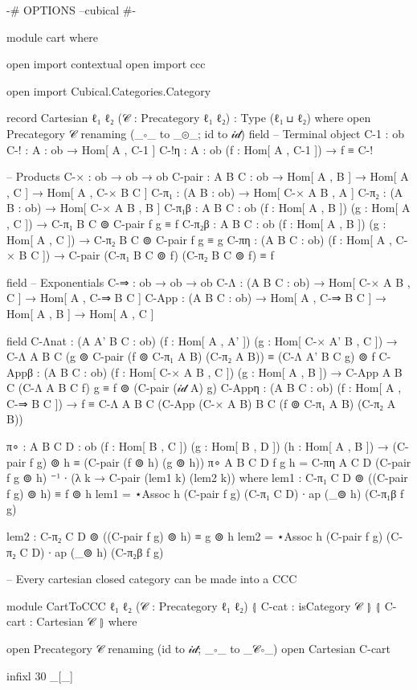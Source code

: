 \begin{code}[hide]
{-# OPTIONS --cubical #-}

module cart where

open import contextual
open import ccc

open import Cubical.Categories.Category

record Cartesian {ℓ₁ ℓ₂} (𝒞 : Precategory ℓ₁ ℓ₂) : Type (ℓ₁ ⊔ ℓ₂) where
  open Precategory 𝒞 renaming (_∘_ to _⊚_; id to 𝒾𝒹)
  field
    -- Terminal object
    C-1 : ob
    C-! : {A : ob} → Hom[ A , C-1 ]
    C-!η : {A : ob} (f : Hom[ A , C-1 ]) → f ≡ C-!

    -- Products
    C-× : ob → ob → ob
    C-pair : {A B C : ob} → Hom[ A , B ] → Hom[ A , C ] → Hom[ A , C-× B C ]
    C-π₁ : (A B : ob) → Hom[ C-× A B , A ]
    C-π₂ : (A B : ob) → Hom[ C-× A B , B ]
    C-π₁β : {A B C : ob} (f : Hom[ A , B ]) (g : Hom[ A , C ]) →
      C-π₁ B C ⊚ C-pair f g ≡ f
    C-π₂β : {A B C : ob} (f : Hom[ A , B ]) (g : Hom[ A , C ]) →
      C-π₂ B C ⊚ C-pair f g ≡ g
    C-πη : (A B C : ob) (f : Hom[ A , C-× B C ]) →
      C-pair (C-π₁ B C ⊚ f) (C-π₂ B C ⊚ f) ≡ f

  field
    -- Exponentials
    C-⇒ : ob → ob → ob
    C-Λ : (A B C : ob) → Hom[ C-× A B , C ] → Hom[ A , C-⇒ B C ]
    C-App : (A B C : ob) → Hom[ A , C-⇒ B C ] → Hom[ A , B ] → Hom[ A , C ]

  field
    C-Λnat : (A A' B C : ob) (f : Hom[ A , A' ]) (g : Hom[ C-× A' B , C ]) →
      C-Λ A B C (g ⊚ C-pair (f ⊚ C-π₁ A B) (C-π₂ A B)) ≡ (C-Λ A' B C g) ⊚ f
    C-Appβ : (A B C : ob) (f : Hom[ C-× A B , C ]) (g : Hom[ A , B ]) →
      C-App A B C (C-Λ A B C f) g ≡ f ⊚ (C-pair (𝒾𝒹 A) g)
    C-Appη : (A B C : ob) (f : Hom[ A , C-⇒ B C ]) →
      f ≡ C-Λ A B C (C-App (C-× A B) B C (f ⊚ C-π₁ A B) (C-π₂ A B))

  π∘ : {A B C D : ob} (f : Hom[ B , C ]) (g : Hom[ B , D ]) (h : Hom[ A , B ]) →
    (C-pair f g) ⊚ h ≡ (C-pair (f ⊚ h) (g ⊚ h))
  π∘ {A} {B} {C} {D} f g h =
    C-πη A C D (C-pair f g ⊚ h) ⁻¹
    ∙ (λ k → C-pair (lem1 k) (lem2 k)) where
      lem1 : C-π₁ C D ⊚ ((C-pair f g) ⊚ h) ≡ f ⊚ h
      lem1 =
        ⋆Assoc h (C-pair f g) (C-π₁ C D)
        ∙ ap (_⊚ h) (C-π₁β f g)

      lem2 : C-π₂ C D ⊚ ((C-pair f g) ⊚ h) ≡ g ⊚ h
      lem2 =
        ⋆Assoc h (C-pair f g) (C-π₂ C D)
        ∙ ap (_⊚ h) (C-π₂β f g)

-- Every cartesian closed category can be made into a CCC

module CartToCCC {ℓ₁ ℓ₂} (𝒞 : Precategory ℓ₁ ℓ₂)
       ⦃ C-cat : isCategory 𝒞 ⦄ ⦃ C-cart : Cartesian 𝒞 ⦄ where

  open Precategory 𝒞 renaming (id to 𝒾𝒹; _∘_ to _𝒞∘_)
  open Cartesian C-cart

  infixl 30 _[_]
\end{code}

